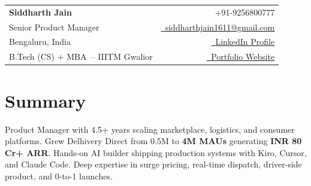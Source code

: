 \documentclass[a4paper,11pt]{article}
\makeatletter
\newcommand{\name}{Siddharth Jain} %
\newcommand{\course}{B.Tech (CS) + MBA} %
\newcommand{\phone}{9256800777} %
\newcommand{\emaila}{siddharthjain1611@gmail.com} %
\makeatother
\begin{document}
\selectfont

{
\begin{tabularx}{\linewidth}{L r} \\
  \textbf{\Large \name} & {\raisebox{0.0\height}{\footnotesize \faPhone}\ +91-\phone}\\
  {Senior Product Manager} & \href{mailto:\emaila}{\raisebox{0.0\height}{\footnotesize \faEnvelope}\ {\emaila}} \\
  {Bengaluru, India} & \href{https://linkedin.com/in/siddharth-jain}{\raisebox{0.0\height}{\footnotesize \faLinkedin}\ {LinkedIn Profile}} \\  
  {\course\ -- IIITM Gwalior} & \href{https://siddharthjain1611.github.io}{\raisebox{0.0\height}{\footnotesize \faGlobe}\ {Portfolio Website}}
\end{tabularx}
}


\section{\textbf{Summary}}
\vspace{1mm}
\small{Product Manager with 4.5+ years scaling marketplace, logistics, and consumer platforms. Grew Delhivery Direct from 0.5M to \textbf{4M MAUs} generating \textbf{INR 80 Cr+ ARR}. Hands-on AI builder shipping production systems with Kiro, Cursor, and Claude Code. Deep expertise in surge pricing, real-time dispatch, driver-side product, and 0-to-1 launches.}
\vspace{-2mm}

\end{document}
